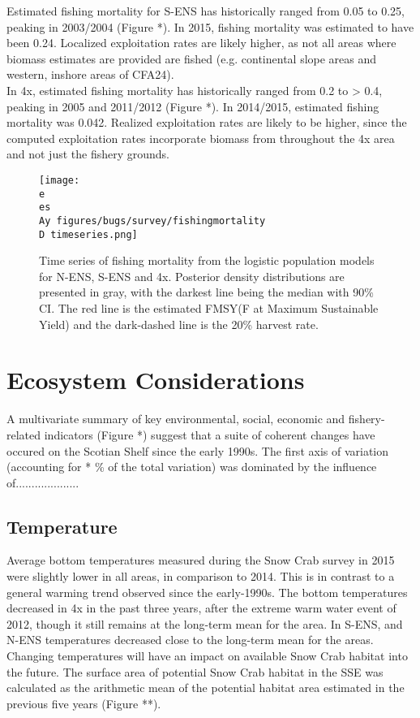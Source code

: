 \documentclass[paper=a4, fontsize=11pt]{article}
\newcommand{\D}{.}
\newcommand{\e}{\string~/ecomod_data/}
\newcommand{\es}{snowcrab/}
\newcommand{\Ay}{assessments/2015/}
\begin{document}
Estimated fishing mortality for S-ENS has historically ranged from 0.05 to 0.25, peaking in 2003/2004 (Figure *). In 2015, fishing mortality was estimated to have been 0.24. Localized exploitation rates are likely higher, as not all areas where biomass estimates are provided are fished (e.g. continental slope areas and western, inshore areas of CFA24).\\

In 4x, estimated fishing mortality has historically ranged from 0.2 to > 0.4, peaking in 2005 and 
2011/2012 (Figure *). In 2014/2015, estimated fishing mortality was 0.042. Realized exploitation rates are likely to be higher, since the computed exploitation rates incorporate biomass from throughout the 4x area and not just the fishery grounds.

\begin{figure}[ht]
    \centering
    \texttt{[image: \\e \\es \\Ay figures/bugs/survey/fishingmortality\\D timeseries.png]}
    \caption{Time series of fishing mortality from the logistic population models for N-ENS, S-ENS and 4x. Posterior density distributions are presented in gray, with the darkest line being the median with 90\% CI. The red line is the estimated FMSY(F at Maximum Sustainable Yield) and the dark-dashed line is the 20\% harvest rate.}
\end{figure}
\clearpage

\section{Ecosystem Considerations}
A multivariate summary of key environmental, social, economic and fishery-related indicators (Figure *) suggest that a suite of coherent changes have occured on the Scotian Shelf since the early 1990s. The first axis of variation (accounting for * \% of the total variation) was dominated by the influence of....................

\subsection{Temperature}
Average bottom temperatures measured during the Snow Crab survey in 2015 were slightly lower in all areas, in comparison to 2014. This is in contrast to a general warming trend observed since the early-1990s. The bottom temperatures decreased in 4x in the past three years, after the extreme warm water event of 2012, though it still remains at the long-term mean for the area. In S-ENS, and N-ENS temperatures decreased close to the long-term mean for the areas. Changing temperatures will have an impact on available Snow Crab habitat into the future. The surface area of potential Snow Crab habitat in the SSE was calculated as the arithmetic mean of the potential habitat area estimated in the previous five years (Figure **). 
\end{document}

